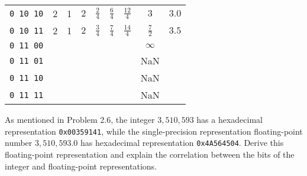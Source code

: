 \documentclass[12pt]{article}
\newenvironment{ex}[2][Exercise]{\begin{trivlist}
		\item[\hskip \labelsep {\bfseries #1}\hskip \labelsep {\bfseries #2.}]}{\end{trivlist}}
\newenvironment{sol}[1][Solution]{\begin{trivlist}
		\item[\hskip \labelsep {\bfseries #1:}]}{\end{trivlist}}
\begin{document}
\begin{sol}
\begin{center}
\begin{tabular}{ccccccccc}
			\texttt{0 10 10} & 2 & 1 & $2$ & $\frac{2}{4}$ & $\frac{6}{4}$ & $\frac{12}{4}$ & $3$ & $3.0$ \\
			
			\texttt{0 10 11} & 2 & 1 & $2$ & $\frac{3}{4}$ & $\frac{7}{4}$ & $\frac{14}{4}$ & $\frac{7}{2}$ & $3.5$ \\
			
			\texttt{0 11 00} & \makebox[1cm]{\hrulefill} & \makebox[1cm]{\hrulefill} & \makebox[1cm]{\hrulefill} & \makebox[1cm]{\hrulefill} & \makebox[1cm]{\hrulefill} & \makebox[1cm]{\hrulefill} & $\infty$ & \makebox[1cm]{\hrulefill} \\
			
			\texttt{0 11 01} & \makebox[1cm]{\hrulefill} & \makebox[1cm]{\hrulefill} & \makebox[1cm]{\hrulefill} & \makebox[1cm]{\hrulefill} & \makebox[1cm]{\hrulefill} & \makebox[1cm]{\hrulefill} & NaN & \makebox[1cm]{\hrulefill} \\
			
			\texttt{0 11 10} & \makebox[1cm]{\hrulefill} & \makebox[1cm]{\hrulefill} & \makebox[1cm]{\hrulefill} & \makebox[1cm]{\hrulefill} & \makebox[1cm]{\hrulefill} & \makebox[1cm]{\hrulefill} & NaN & \makebox[1cm]{\hrulefill} \\
			
			\texttt{0 11 11} & \makebox[1cm]{\hrulefill} & \makebox[1cm]{\hrulefill} & \makebox[1cm]{\hrulefill} & \makebox[1cm]{\hrulefill} & \makebox[1cm]{\hrulefill} & \makebox[1cm]{\hrulefill} & NaN & \makebox[1cm]{\hrulefill} \\
		\end{tabular}
	\end{center}
\end{sol}

\begin{ex}{2.48}
	As mentioned in Problem 2.6, the integer $3,510,593$ has a hexadecimal representation
	\texttt{0x00359141}, while the single-precision representation floating-point
	number  $3,510,593.0$ has hexadecimal representation \texttt{0x4A564504}. Derive
	this floating-point representation and explain the correlation between the bits of the
	integer and floating-point representations.
\end{ex}
\end{document}
